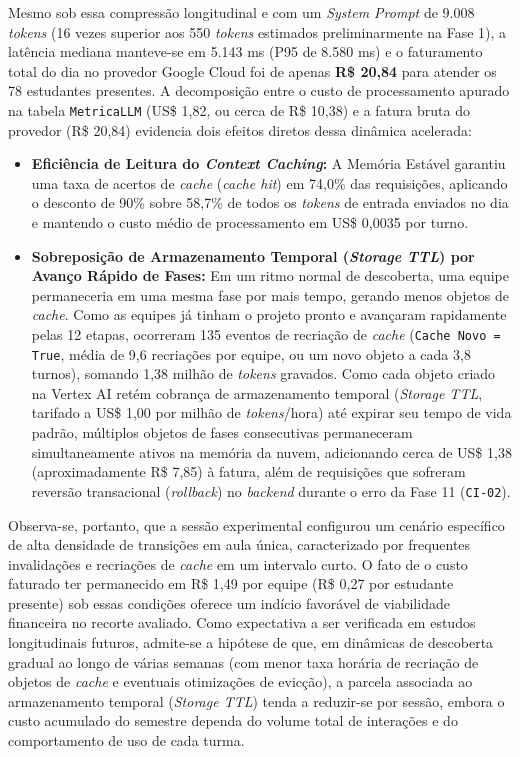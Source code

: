 Mesmo sob essa compressão longitudinal e com um \textit{System Prompt} de 9.008 \textit{tokens} (16 vezes superior aos 550 \textit{tokens} estimados preliminarmente na Fase 1), a latência mediana manteve-se em 5.143 ms (P95 de 8.580 ms) e o faturamento total do dia no provedor Google Cloud foi de apenas \textbf{R\$ 20,84} para atender os 78 estudantes presentes. A decomposição entre o custo de processamento apurado na tabela \texttt{MetricaLLM} (US\$ 1,82, ou cerca de R\$ 10,38) e a fatura bruta do provedor (R\$ 20,84) evidencia dois efeitos diretos dessa dinâmica acelerada:

\begin{itemize}
    \item \textbf{Eficiência de Leitura do \textit{Context Caching}:} A Memória Estável garantiu uma taxa de acertos de \textit{cache} (\textit{cache hit}) em 74,0\% das requisições, aplicando o desconto de 90\% sobre 58,7\% de todos os \textit{tokens} de entrada enviados no dia e mantendo o custo médio de processamento em US\$ 0,0035 por turno.
    \item \textbf{Sobreposição de Armazenamento Temporal (\textit{Storage TTL}) por Avanço Rápido de Fases:} Em um ritmo normal de descoberta, uma equipe permaneceria em uma mesma fase por mais tempo, gerando menos objetos de \textit{cache}. Como as equipes já tinham o projeto pronto e avançaram rapidamente pelas 12 etapas, ocorreram 135 eventos de recriação de \textit{cache} (\texttt{Cache Novo = True}, média de 9,6 recriações por equipe, ou um novo objeto a cada 3,8 turnos), somando 1,38 milhão de \textit{tokens} gravados. Como cada objeto criado na Vertex AI retém cobrança de armazenamento temporal (\textit{Storage TTL}, tarifado a US\$ 1,00 por milhão de \textit{tokens}/hora) até expirar seu tempo de vida padrão, múltiplos objetos de fases consecutivas permaneceram simultaneamente ativos na memória da nuvem, adicionando cerca de US\$ 1,38 (aproximadamente R\$ 7,85) à fatura, além de requisições que sofreram reversão transacional (\textit{rollback}) no \textit{backend} durante o erro da Fase 11 (\texttt{CI-02}).
\end{itemize}

Observa-se, portanto, que a sessão experimental configurou um cenário específico de alta densidade de transições em aula única, caracterizado por frequentes invalidações e recriações de \textit{cache} em um intervalo curto. O fato de o custo faturado ter permanecido em R\$ 1,49 por equipe (R\$ 0,27 por estudante presente) sob essas condições oferece um indício favorável de viabilidade financeira no recorte avaliado. Como expectativa a ser verificada em estudos longitudinais futuros, admite-se a hipótese de que, em dinâmicas de descoberta gradual ao longo de várias semanas (com menor taxa horária de recriação de objetos de \textit{cache} e eventuais otimizações de evicção), a parcela associada ao armazenamento temporal (\textit{Storage TTL}) tenda a reduzir-se por sessão, embora o custo acumulado do semestre dependa do volume total de interações e do comportamento de uso de cada turma.

